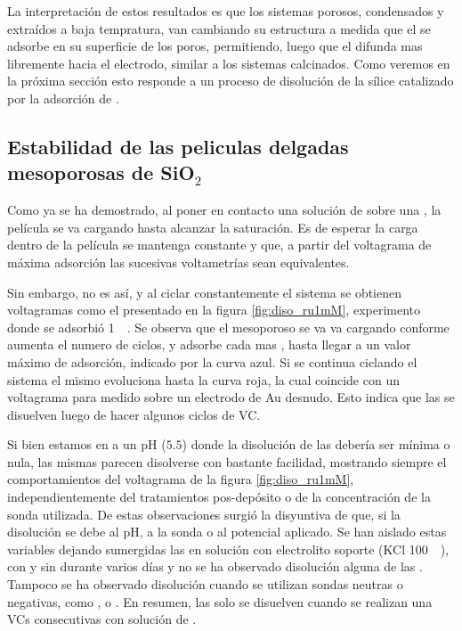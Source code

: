 		La interpretación de estos resultados es que los sistemas porosos, condensados y extraídos a baja tempratura, van cambiando su estructura a medida que el \ru\space se adsorbe en su superficie de los poros, permitiendo, luego que el \fc\space difunda mas libremente hacia el electrodo, similar a los sistemas calcinados. Como veremos en la próxima sección esto responde a un proceso de disolución de la sílice catalizado por la adsorción de \aminorutenio.

	\subsection{Estabilidad de las peliculas delgadas mesoporosas de \texorpdfstring{SiO$_2$}{SiO2}}

		Como ya se ha demostrado, al poner en contacto una solución de \ru\space sobre una \pdmF, la película se va cargando hasta alcanzar la saturación. Es de esperar la carga dentro de la película se mantenga constante y que, a partir del voltagrama de máxima adsorción las sucesivas voltametrías sean equivalentes.

		Sin embargo, no es así, y al ciclar constantemente el sistema se obtienen voltagramas como el presentado en la figura \ref{fig:diso_ru1mM}, experimento donde se adsorbió \ru\space \SI{1}{\milli\Molar}. Se observa que el mesoporoso se va va cargando conforme aumenta el numero de ciclos, y adsorbe cada mas \ru, hasta llegar a un valor máximo de adsorción, indicado por la curva azul. Si se continua ciclando el sistema el mismo evoluciona hasta la curva roja, la cual coincide con un voltagrama para \ru\space medido sobre un electrodo de Au desnudo. Esto indica que las \pdmF\space se disuelven luego de hacer algunos ciclos de VC.

		Si bien estamos en a un pH ($5.5$) donde la disolución de las \pdmF\space debería ser mínima o nula, las mismas parecen disolverse con bastante facilidad, mostrando siempre el comportamientos del voltagrama de la figura \ref{fig:diso_ru1mM}, independientemente del tratamientos pos-depósito o de la concentración de la sonda utilizada. De estas observaciones surgió la disyuntiva de que, si la disolución se debe al pH, a la sonda o al potencial aplicado. Se han aislado estas variables dejando sumergidas las \pdmF\space en solución con electrolito soporte (KCl \SI{100}{\milli\Molar}), con y sin \ru\space durante varios días y no se ha observado disolución alguna de las \pdm. Tampoco se ha observado disolución cuando se utilizan sondas neutras o negativas, como \fe, \hq\space o \fc. En resumen, las \pdmF\space solo se disuelven cuando se realizan una VCs consecutivas con solución de \ru\space.
			
